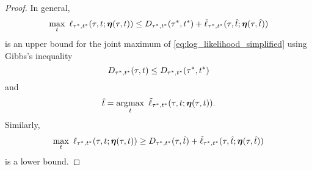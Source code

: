\begin{proof}
In general,
$$
\max_{t} \ \ell_{\tau^*,t^*}(\tau, t; \fullAncestralSplitPartitions(\tau,t)) \le
    \shannonDivergence_{\tau^*,t^*}(\tau^*,t^*)
    + \tilde{\ell}_{\tau^*,t^*}(\tau, \hat{t}; \fullAncestralSplitPartitions(\tau, \hat{t}))
$$
is an upper bound for the joint maximum of \eqref{eq:log_likelihood_simplified} using Gibbs's inequality
$$
D_{\tau^*,t^*}(\tau,t) \le D_{\tau^*,t^*}(\tau^*,t^*)
$$
and
$$
\hat{t} = \argmax_{t} \ \tilde{\ell}_{\tau^*,t^*}(\tau, t; \fullAncestralSplitPartitions(\tau,t)).
$$
Similarly,
$$
\max_{t} \ \ell_{\tau^*,t^*}(\tau, t; \boldsymbol\eta(\tau,t)) \ge
    D_{\tau^*,t^*}(\tau,\hat{t})
    + \tilde{\ell}_{\tau^*,t^*}(\tau, \hat{t}; \boldsymbol\eta(\tau, \hat{t}))
$$
is a lower bound.


\end{proof}
